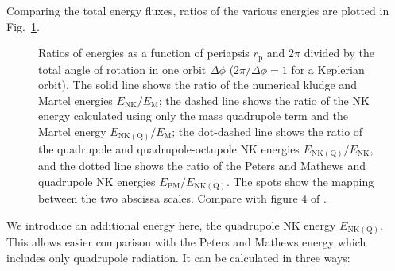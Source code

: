 \documentclass[useAMS,usedcolumn,usegraphicx,usenatbib]{mn2e}
\newcommand{\figref}[1]{Fig.~\ref{fig:#1}}
\newcommand{\sub}[1]{\ensuremath{_\mathrm{#1}}}
\begin{document}
Comparing the total energy fluxes, ratios of the various energies are plotted in \figref{Energy_ratio}.
\begin{figure}
  \begin{center}
    \quad
    \caption{Ratios of energies as a function of periapsis $r\sub{p}$ and $2\pi$ divided by the total angle of rotation in one orbit $\Delta\phi$ ($2\pi/\Delta\phi = 1$ for a Keplerian orbit). The solid line shows the ratio of the numerical kludge and Martel energies $E\sub{NK}/E\sub{M}$; the dashed line shows the ratio of the NK energy calculated using only the mass quadrupole term and the Martel energy $E\sub{NK(Q)}/E\sub{M}$; the dot-dashed line shows the ratio of the quadrupole and quadrupole-octupole NK energies $E\sub{NK(Q)}/E\sub{NK}$, and the dotted line shows the ratio of the Peters and Mathews and quadrupole NK energies $E\sub{PM}/E\sub{NK(Q)}$. The spots show the mapping between the two abscissa scales. Compare with figure 4 of \citet{Gair2005}.}
    \label{fig:Energy_ratio}
  \end{center}
\end{figure}
We introduce an additional energy here, the quadrupole NK energy $E\sub{NK(Q)}$. This allows easier comparison with the Peters and Mathews energy which includes only quadrupole radiation. It can be calculated in three ways:
\end{document}
